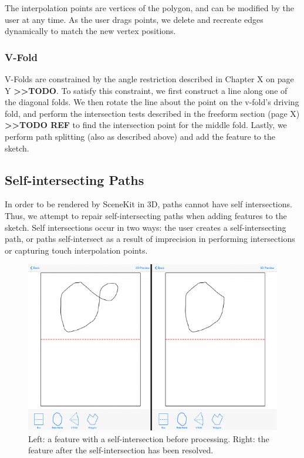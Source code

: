 The interpolation points are vertices of the polygon, and can be
modified by the user at any time. As the user drags points, we delete
and recreate edges dynamically to match the new vertex positions.

\subsubsection{V-Fold}\label{v-fold}

V-Folds are constrained by the angle restriction described in Chapter X
on page Y \textbf{\textgreater{}\textgreater{}TODO}. To satisfy this
constraint, we first construct a line along one of the diagonal folds.
We then rotate the line about the point on the v-fold's driving fold,
and perform the intersection tests described in the freeform section
(page X) \textbf{\textgreater{}\textgreater{}TODO REF} to find the
intersection point for the middle fold. Lastly, we perform path
splitting (also as described above) and add the feature to the sketch.

\subsection{Self-intersecting Paths}\label{self-intersecting-paths}

In order to be rendered by SceneKit in 3D, paths cannot have self
intersections. Thus, we attempt to repair self-intersecting paths when
adding features to the sketch. Self intersections occur in two ways: the
user creates a self-intersecting path, or paths self-intersect as a
result of imprecision in performing intersections or capturing touch
interpolation points. ~ ~

\begin{figure}[htbp]
\centering
\includegraphics{figures/41_Tech_Tool_Implementation/loopBeforeAfter.pdf}
\caption{Left: a feature with a self-intersection before processing.
Right: the feature after the self-intersection has been resolved.}
\end{figure}

